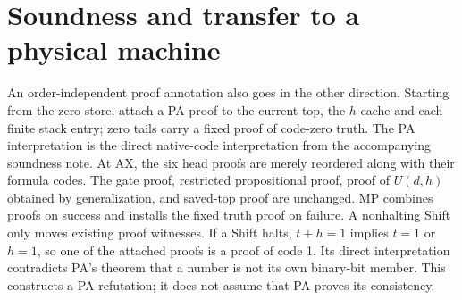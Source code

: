 \documentclass[10pt]{article}
\begin{document}
\section{Soundness and transfer to a physical machine}

An order-independent proof annotation also goes in the other
direction.  Starting from the zero store, attach a PA proof to the
current top, the $h$ cache and each finite stack entry; zero tails
carry a fixed proof of code-zero truth.  The PA interpretation is
the direct native-code interpretation from the accompanying
soundness note.  At AX, the six head proofs are merely reordered
along with their formula codes.  The gate proof, restricted
propositional proof, proof of $U(d,h)$ obtained by generalization,
and saved-top proof are unchanged.  MP combines proofs on success
and installs the fixed truth proof on failure.  A nonhalting Shift
only moves existing proof witnesses.  If a Shift halts, $t+h=1$
implies $t=1$ or $h=1$, so one of the attached proofs is a proof
of code 1.  Its direct interpretation contradicts PA's theorem
that a number is not its own binary-bit member.  This constructs
a PA refutation; it does not assume that PA proves its consistency.
\end{document}
